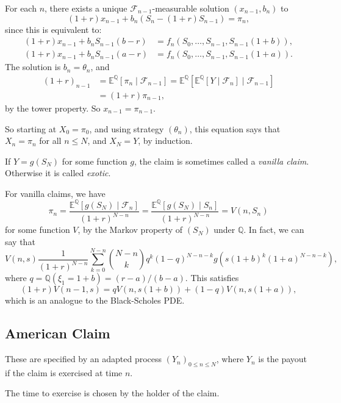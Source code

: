 \documentclass[12pt]{article}
\begin{document}
\begin{proofbox}
	For each $n$, there exists a unique $\mathcal{F}_{n-1}$-measurable solution $(x_{n-1}, b_n)$ to
	\[
		(1+r)x_{n-1} + b_n(S_n - (1 + r)S_{n-1}) = \pi_n,
	\]
	since this is equivalent to:
	\begin{align*}
		(1+r)x_{n-1} + b_n S_{n-1}(b - r) &= f_n(S_0, \ldots, S_{n-1}, S_{n-1}(1+b)),\\
		(1+r)x_{n-1} + b_n S_{n-1}(a - r) &= f_n(S_0, \ldots,S_{n-1}, S_{n-1}(1+a)).
	\end{align*}
	The solution is $b_n = \theta_n$, and
	\begin{align*}
		(1 + r)_{n-1} &= \mathbb{E}^{\mathbb{Q}}[\pi_n \mid \mathcal{F}_{n-1}] = \mathbb{E}^{\mathbb{Q}}[\mathbb{E}^{\mathbb{Q}}[Y \mid \mathcal{F}_n] \mid \mathcal{F}_{n-1}] \\
			      &= (1+r)\pi_{n-1},
	\end{align*}
	by the tower property. So $x_{n-1} = \pi_{n-1}$.

	So starting at $X_0 = \pi_0$, and using strategy $(\theta_n)$, this equation says that $X_n = \pi_n$ for all $n \leq N$, and $X_N = Y$, by induction.
\end{proofbox}

\begin{remark}
	If $Y = g(S_N)$ for some function $g$, the claim is sometimes called a \emph{vanilla claim}. Otherwise it is called \emph{exotic}.

	For vanilla claims, we have
	\[
	\pi_n = \frac{\mathbb{E}^{\mathbb{Q}}[g(S_N) \mid \mathcal{F}_n]}{(1+r)^{N - n}} = \frac{\mathbb{E}^{\mathbb{Q}}[g(S_N)\mid S_n]}{(1 + r)^{N - n}} = V(n, S_n)
	\]
	for some function $V$, by the Markov property of $(S_N)$ under $\mathbb{Q}$. In fact, we can say that
	\[
		V(n, s) \frac{1}{(1 + r)^{N - n}} \sum_{k = 0}^{N - n} \binom{N-n}{k} q^{k}(1 - q)^{N - n - k} g(s(1+b)^k(1+a)^{N - n - k}),
	\]
	where $q = \mathbb{Q}(\xi_1 = 1 + b) = (r-a)/(b-a)$. This satisfies
	\[
		(1 + r)V(n-1, s) = q V(n, s(1+b)) + (1 - q) V(n, s(1 + a)),
	\]
	which is an analogue to the Black-Scholes PDE.
\end{remark}

\subsection{American Claim}%
\label{sub:american}

\begin{definition}
	These are specified by an adapted process $(Y_n)_{0 \leq n \leq N}$, where $Y_n$ is the payout if the claim is exercised at time $n$.

	The time to exercise is chosen by the holder of the claim.
\end{definition}
\end{document}
